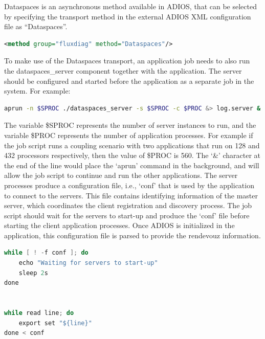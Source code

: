 Dataspaces is an asynchronous method available in ADIOS, that can be selected by specifying 
the transport method in the external ADIOS XML configuration file as ``Dataspaces''.

\begin{lstlisting}[language=XML, caption=Select Dataspaces as a transport method in the configuration file example.]
<method group="fluxdiag" method="Dataspaces"/>
\end{lstlisting}

To make use of the Dataspaces transport, an application job needs to also run the dataspaces\_server 
component together with the application. The server should be configured and started 
before the application as a separate job in the system. For example:

\begin{lstlisting}[language=bash, caption=Start the server component in a job file first.]
aprun -n $SPROC ./dataspaces_server -s $SPROC -c $PROC &> log.server &
\end{lstlisting}

The variable \$SPROC represents the number of server instances to run, and the 
variable \$PROC represents the number of application processes. For example if 
the job script runs a coupling scenario with two applications that run on 128 and 
432 processors respectively, then the value of \$PROC is 560. The `\&' character 
at the end of the line would place the `aprun' command in the background, and will 
allow the job script to continue and run the other applications. The server processes 
produce a configuration file, i.e., `conf' that is used by the application  
to connect to the servers. This file contains identifying information of the 
master server, which coordinates the client registration 
and discovery process. The job script should wait for the servers to start-up and 
produce the `conf' file before starting the client application processes. 
Once ADIOS is initialized in the application, this configuration file is parsed
to provide the rendevouz information. 

\begin{lstlisting}[language=C, caption=Wait for server start-up completion and export the configuration to environment variables.]
while [ ! -f conf ]; do
	echo "Waiting for servers to start-up"
	sleep 2s
done


while read line; do
	export set "${line}"
done < conf
\end{lstlisting}

